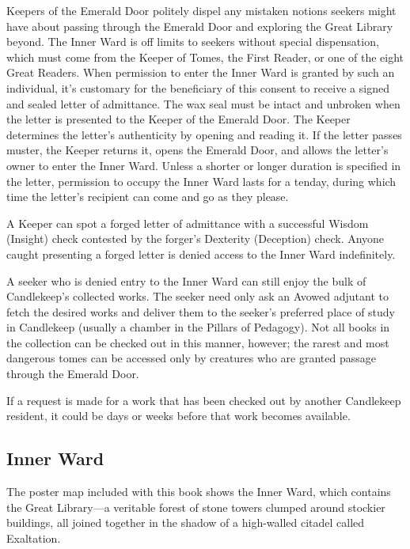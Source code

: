 \documentclass[10pt,a4paper,twoside,bg=print,twocolumn,openany,nodeprecatedcode]{dndbook}
\begin{document}
Keepers of the Emerald Door politely dispel any mistaken notions seekers might have about passing through the Emerald Door and exploring the Great Library beyond. The Inner Ward is off limits to seekers without special dispensation, which must come from the Keeper of Tomes, the First Reader, or one of the eight Great Readers. When permission to enter the Inner Ward is granted by such an individual, it's customary for the beneficiary of this consent to receive a signed and sealed letter of admittance. The wax seal must be intact and unbroken when the letter is presented to the Keeper of the Emerald Door. The Keeper determines the letter's authenticity by opening and reading it. If the letter passes muster, the Keeper returns it, opens the Emerald Door, and allows the letter's owner to enter the Inner Ward. Unless a shorter or longer duration is specified in the letter, permission to occupy the Inner Ward lasts for a tenday, during which time the letter's recipient can come and go as they please.

A Keeper can spot a forged letter of admittance with a successful Wisdom (Insight) check contested by the forger's Dexterity (Deception) check. Anyone caught presenting a forged letter is denied access to the Inner Ward indefinitely.

A seeker who is denied entry to the Inner Ward can still enjoy the bulk of Candlekeep's collected works. The seeker need only ask an Avowed adjutant to fetch the desired works and deliver them to the seeker's preferred place of study in Candlekeep (usually a chamber in the Pillars of Pedagogy). Not all books in the collection can be checked out in this manner, however; the rarest and most dangerous tomes can be accessed only by creatures who are granted passage through the Emerald Door.

If a request is made for a work that has been checked out by another Candlekeep resident, it could be days or weeks before that work becomes available.

\subsection{Inner Ward}
The poster map included with this book shows the Inner Ward, which contains the Great Library—a veritable forest of stone towers clumped around stockier buildings, all joined together in the shadow of a high-walled citadel called Exaltation.
\end{document}
